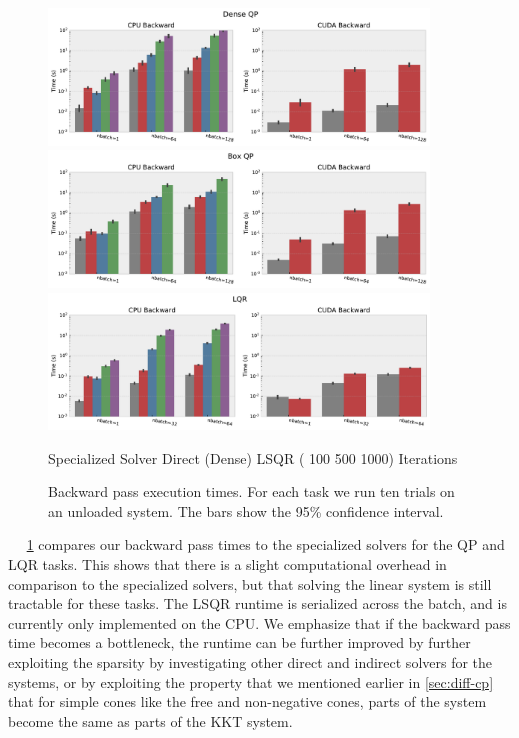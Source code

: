 \begin{figure}[!t]
  \centering
  \includegraphics[width=0.9\textwidth]{prof/prof_qp_dense-backward.pdf}
  \includegraphics[width=0.9\textwidth]{prof/prof_qp_box-backward.pdf}
  \includegraphics[width=0.9\textwidth]{prof/prof_mpc-backward.pdf}

   Specialized Solver \enskip
   Direct (Dense) \enskip
  LSQR
  ( 100  500  1000)
  Iterations
  \caption{
    Backward pass execution times.
    For each task we run ten trials on an unloaded system.
    The bars show the 95\% confidence interval.
  }
  \label{fig:cvxpyth:bw}
\end{figure}

\newpage~\newpage~\newpage
\cref{fig:cvxpyth:bw} compares our backward pass times to
the specialized solvers for the QP and LQR tasks.
This shows that there is a slight computational overhead
in comparison to the specialized solvers, but that
solving the linear system is still tractable for these tasks.
The LSQR runtime is serialized across the batch, and is
currently only implemented on the CPU.
We emphasize that if the backward pass time becomes a bottleneck,
the runtime can be further improved by further exploiting the
sparsity by investigating other direct and indirect solvers
for the systems, or by exploiting the property that we mentioned
earlier in \cref{sec:diff-cp} that for simple cones like the
free and non-negative cones, parts of the system become the same as
parts of the KKT system.

